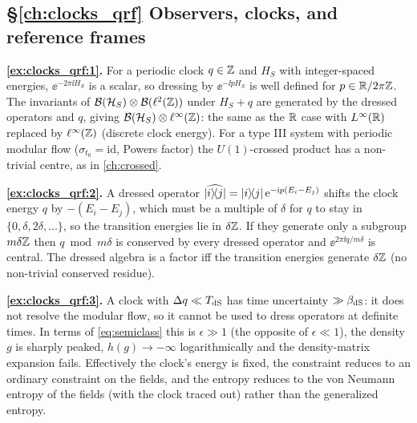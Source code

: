 {\subsection*{\S\ref{ch:clocks_qrf} Observers, clocks, and reference frames}
\textbf{\ref{ex:clocks_qrf:1}.} For a periodic clock $q\in\mathbb{Z}$ and $H_S$ with integer-spaced energies, $\ee^{-2\pi\ii H_S}$ is a scalar, so dressing by $\ee^{-\ii pH_S}$ is well defined for $p\in\mathbb{R}/2\pi\mathbb{Z}$. The invariants of $\mathcal{B}(\mathcal{H}_S)\otimes\mathcal{B}(\ell^2(\mathbb{Z}))$ under $H_S+q$ are generated by the dressed operators and $q$, giving $\mathcal{B}(\mathcal{H}_S)\otimes\ell^\infty(\mathbb{Z})$: the same as the $\mathbb{R}$ case with $L^\infty(\mathbb{R})$ replaced by $\ell^\infty(\mathbb{Z})$ (discrete clock energy). For a type III system with periodic modular flow ($\sigma_{t_0}=\mathrm{id}$, Powers factor) the $U(1)$-crossed product has a non-trivial centre, as in \cref{ch:crossed}.\par
\textbf{\ref{ex:clocks_qrf:2}.} A dressed operator $\widehat{\lvert i\rangle\!\langle j\rvert}=\lvert i\rangle\!\langle j\rvert\,\mathrm{e}^{-\mathrm{i} p(E_i-E_j)}$ shifts the clock energy $q$ by $-(E_i-E_j)$, which must be a multiple of $\delta$ for $q$ to stay in $\{0,\delta,2\delta,\dots\}$, so the transition energies lie in $\delta\mathbb{Z}$. If they generate only a subgroup $m\delta\mathbb{Z}$ then $q\bmod m\delta$ is conserved by every dressed operator and $\ee^{2\pi\ii q/m\delta}$ is central. The dressed algebra is a factor iff the transition energies generate $\delta\mathbb{Z}$ (no non-trivial conserved residue).\par
\textbf{\ref{ex:clocks_qrf:3}.} A clock with $\Delta q\ll T_{\rm dS}$ has time uncertainty $\gg\beta_{\rm dS}$: it does not resolve the modular flow, so it cannot be used to dress operators at definite times. In terms of \eqref{eq:semiclass} this is $\epsilon\gg1$ (the opposite of $\epsilon\ll1$), the density $g$ is sharply peaked, $h(g)\to-\infty$ logarithmically and the density-matrix expansion fails. Effectively the clock's energy is fixed, the constraint reduces to an ordinary constraint on the fields, and the entropy reduces to the von Neumann entropy of the fields (with the clock traced out) rather than the generalized entropy.\par

}
